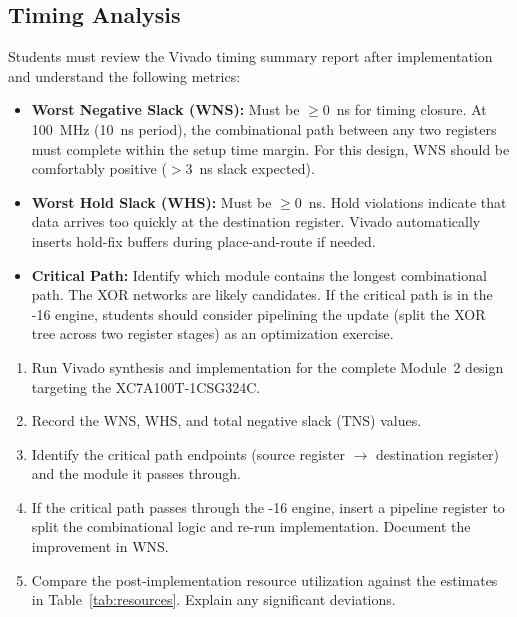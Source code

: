 \documentclass[11pt,letterpaper]{article}
\begin{document}
	\subsection{Timing Analysis}

	Students must review the Vivado timing summary report after implementation and understand the following metrics:

	\begin{itemize}[leftmargin=2em]
		\item \textbf{Worst Negative Slack (WNS):} Must be $\geq 0$~ns for timing closure. At 100~MHz (10~ns period), the combinational path between any two registers must complete within the setup time margin. For this design, WNS should be comfortably positive ($> 3$~ns slack expected).
		\item \textbf{Worst Hold Slack (WHS):} Must be $\geq 0$~ns. Hold violations indicate that data arrives too quickly at the destination register. Vivado automatically inserts hold-fix buffers during place-and-route if needed.
		\item \textbf{Critical Path:} Identify which module contains the longest combinational path. The \CRC{} XOR networks are likely candidates. If the critical path is in the \CRC{}-16 engine, students should consider pipelining the \CRC{} update (split the XOR tree across two register stages) as an optimization exercise.
	\end{itemize}

	\begin{tcolorbox}[infobox={Exercise: Timing Closure Analysis}]
		\begin{enumerate}
			\item Run Vivado synthesis and implementation for the complete Module~2 design targeting the XC7A100T-1CSG324C.
			\item Record the WNS, WHS, and total negative slack (TNS) values.
			\item Identify the critical path endpoints (source register $\rightarrow$ destination register) and the module it passes through.
			\item If the critical path passes through the \CRC{}-16 engine, insert a pipeline register to split the combinational logic and re-run implementation. Document the improvement in WNS.
			\item Compare the post-implementation resource utilization against the estimates in Table~\ref{tab:resources}. Explain any significant deviations.
		\end{enumerate}
	\end{tcolorbox}
\end{document}
